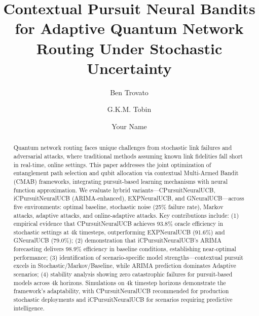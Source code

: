 \documentclass[sigconf,anonymous,review,natbib=false]{acmart}
\begin{document}
\title{Contextual Pursuit Neural Bandits for Adaptive Quantum Network Routing Under Stochastic Uncertainty} 



\author{Ben Trovato}
\author{G.K.M. Tobin}
\authornotemark[1]


\author{Your Name}




\begin{abstract}

Quantum network routing faces unique challenges from stochastic link failures and adversarial attacks, where traditional methods assuming known link fidelities fall short in real-time, online settings. This paper addresses the joint optimization of entanglement path selection and qubit allocation via contextual Multi-Armed Bandit (CMAB) frameworks, integrating pursuit-based learning mechanisms with neural function approximation. We evaluate hybrid variants—CPursuitNeuralUCB, iCPursuitNeuralUCB (ARIMA-enhanced), EXPNeuralUCB, and GNeuralUCB—across five environments: optimal baseline, stochastic noise (25\% failure rate), Markov attacks, adaptive attacks, and online-adaptive attacks. Key contributions include: (1) empirical evidence that CPursuitNeuralUCB achieves 93.8\% oracle efficiency in stochastic settings at 4k timesteps, outperforming EXPNeuralUCB (91.6\%) and GNeuralUCB (79.0\%); (2) demonstration that iCPursuitNeuralUCB's ARIMA forecasting delivers 98.9\% efficiency in baseline conditions, establishing near-optimal performance; (3) identification of scenario-specific model strengths—contextual pursuit excels in Stochastic/Markov/Baseline, while ARIMA prediction dominates Adaptive scenarios; (4) stability analysis showing zero catastrophic failures for pursuit-based models across 4k horizons. Simulations on 4k timestep horizons demonstrate the framework's adaptability, with CPursuitNeuralUCB recommended for production stochastic deployments and iCPursuitNeuralUCB for scenarios requiring predictive intelligence.

\end{abstract}
\end{document}
